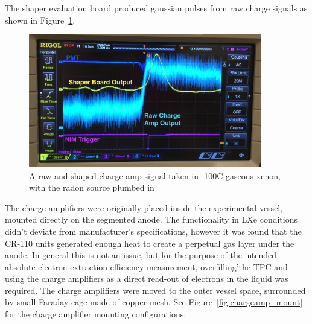 The shaper evaluation board produced gaussian pulses from raw charge signals as shown in Figure~\ref{fig:shaper}.

\begin{figure}[htbp]
\begin{center}
\includegraphics[width=4in]{figures/testbed/charge_amp_shaper.jpg}
\caption{A raw and shaped charge amp signal taken in -100C gaseous xenon, with the radon source plumbed in}
\label{fig:shaper}
\end{center}
\end{figure}

The charge amplifiers were originally placed inside the experimental vessel, mounted directly on the segmented anode. The functionality in \ac{LXe} conditions didn't deviate from manufacturer's specifications, however it was found that the CR-110 units generated enough heat to create a perpetual gas layer under the anode. In general this is not an issue, but for the purpose of the intended absolute electron extraction efficiency measurement, overfilling'the \ac{TPC} and using the charge amplifiers as a direct read-out of electrons in the liquid was required. The charge amplifiers were moved to the outer vessel space, surrounded by small Faraday cage made of copper mesh. See Figure~\ref{fig:chargeamp_mount} for the charge amplifier mounting configurations.

